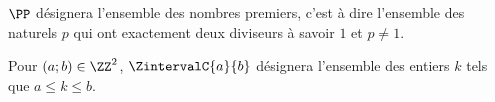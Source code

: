 \begin{notation}
	$\PP$ désignera l'ensemble des nombres premiers, c'est à dire l'ensemble des naturels $p$ qui ont exactement deux diviseurs à savoir $1$ et $p \neq 1$.
\end{notation}


\begin{notation}
	Pour $(a ; b) \in \ZZ^2$, $\ZintervalC{a}{b}$ désignera l'ensemble des entiers $k$ tels que $a \leq k \leq b$.
\end{notation}


